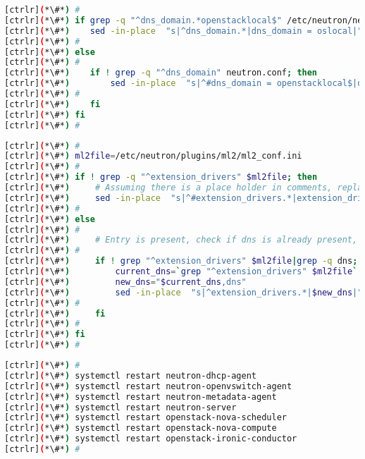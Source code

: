 \begin{lstlisting}[language=bash,keywords={}]
[ctrlr](*\#*) #
[ctrlr](*\#*) if grep -q "^dns_domain.*openstacklocal$" /etc/neutron/neutron.conf; then
[ctrlr](*\#*)    sed -in-place  "s|^dns_domain.*|dns_domain = oslocal|" /etc/neutron/neutron.conf
[ctrlr](*\#*) #
[ctrlr](*\#*) else
[ctrlr](*\#*) #
[ctrlr](*\#*)    if ! grep -q "^dns_domain" neutron.conf; then
[ctrlr](*\#*)        sed -in-place  "s|^#dns_domain = openstacklocal$|dns_domain = oslocal|" /etc/neutron/neutron.conf
[ctrlr](*\#*) #
[ctrlr](*\#*)    fi
[ctrlr](*\#*) fi
[ctrlr](*\#*) #
\end{lstlisting}
\begin{lstlisting}[language=bash,keywords={}]
[ctrlr](*\#*) #
[ctrlr](*\#*) ml2file=/etc/neutron/plugins/ml2/ml2_conf.ini
[ctrlr](*\#*) #
[ctrlr](*\#*) if ! grep -q "^extension_drivers" $ml2file; then
[ctrlr](*\#*)     # Assuming there is a place holder in comments, replace that string
[ctrlr](*\#*)     sed -in-place  "s|^#extension_drivers.*|extension_drivers = port_security,dns|" $ml2file
[ctrlr](*\#*) #
[ctrlr](*\#*) else
[ctrlr](*\#*) #
[ctrlr](*\#*)     # Entry is present, check if dns is already present, if not then enable
[ctrlr](*\#*) #
[ctrlr](*\#*)     if ! grep "^extension_drivers" $ml2file|grep -q dns; then
[ctrlr](*\#*)         current_dns=`grep "^extension_drivers" $ml2file`
[ctrlr](*\#*)         new_dns="$current_dns,dns"
[ctrlr](*\#*)         sed -in-place  "s|^extension_drivers.*|$new_dns|" $ml2file
[ctrlr](*\#*) #
[ctrlr](*\#*)     fi 
[ctrlr](*\#*) #
[ctrlr](*\#*) fi
[ctrlr](*\#*) #
\end{lstlisting}
\begin{lstlisting}[language=bash,keywords={}]
[ctrlr](*\#*) #
[ctrlr](*\#*) systemctl restart neutron-dhcp-agent
[ctrlr](*\#*) systemctl restart neutron-openvswitch-agent
[ctrlr](*\#*) systemctl restart neutron-metadata-agent
[ctrlr](*\#*) systemctl restart neutron-server
[ctrlr](*\#*) systemctl restart openstack-nova-scheduler
[ctrlr](*\#*) systemctl restart openstack-nova-compute
[ctrlr](*\#*) systemctl restart openstack-ironic-conductor
[ctrlr](*\#*) #
\end{lstlisting}
